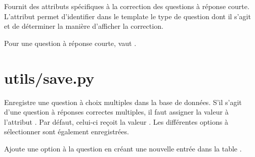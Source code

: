 \documentclass[a4,10pt,french]{sphinxmanual}
\begin{document}
\begin{fulllineitems}
\label{source:quiz.utils.correct.CorrectSq}
Fournit des attributs spécifiques à la correction des questions à réponse courte.
L'attribut  permet d'identifier dans le template le type de question
dont il s'agit et de déterminer la manière d'afficher la correction.

Pour une question à réponse courte,  vaut .

\end{fulllineitems}



\section{utils/save.py}
\label{source:module-quiz.utils.save}\label{source:utils-save-py}

\begin{fulllineitems}
\label{source:quiz.utils.save.SaveQcm}
Enregistre une question à choix multiples dans la base de données. S'il s'agit
d'une question à réponses correctes multiples, il faut assigner la valeur 
à l'attribut . Par défaut, celui-ci reçoit la valeur .
Les différentes options à sélectionner sont également enregistrées.

\begin{fulllineitems}
\label{source:quiz.utils.save.SaveQcm.add_option}
Ajoute une option à la question en créant une nouvelle entrée dans la table
.

\end{fulllineitems}


\end{fulllineitems}

\end{document}
